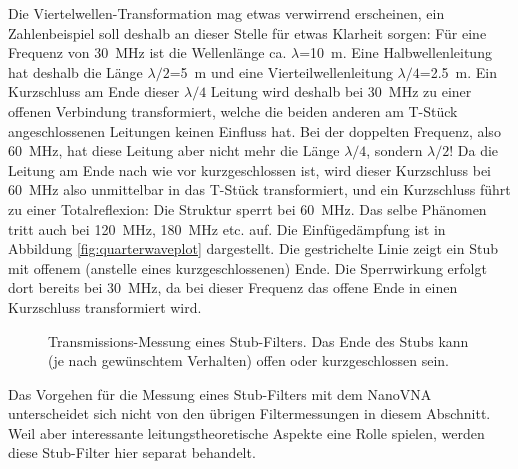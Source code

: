 \documentclass[twoside,a4paper,11pt,halfparskip,DIV=11,notitlepage]{scrartcl}
\begin{document}
Die Viertelwellen-Transformation mag etwas verwirrend erscheinen, ein Zahlenbeispiel
soll deshalb an dieser Stelle für etwas Klarheit sorgen: Für eine Frequenz von
30~MHz ist die Wellenlänge ca. $\lambda$=10~m. Eine Halbwellenleitung hat deshalb
die Länge $\lambda/2$=5~m und eine Vierteilwellenleitung $\lambda/4$=2.5~m. Ein
Kurzschluss am Ende dieser $\lambda/4$ Leitung wird deshalb bei 30~MHz zu einer
offenen Verbindung transformiert, welche die beiden anderen am T-Stück
angeschlossenen Leitungen keinen Einfluss hat. Bei der doppelten Frequenz, also
60~MHz, hat diese Leitung aber nicht mehr die Länge  $\lambda/4$, sondern
$\lambda/2$! Da die Leitung am Ende nach wie vor kurzgeschlossen ist, wird dieser
Kurzschluss bei 60~MHz also unmittelbar in das T-Stück transformiert, und ein
Kurzschluss führt zu einer Totalreflexion: Die Struktur sperrt bei 60~MHz. Das
selbe Phänomen tritt auch bei 120~MHz, 180~MHz etc. auf. Die Einfügedämpfung
ist in Abbildung \ref{fig:quarterwaveplot} dargestellt. Die gestrichelte Linie
zeigt ein Stub mit offenem (anstelle eines kurzgeschlossenen) Ende. Die Sperrwirkung
erfolgt dort bereits bei 30~MHz, da bei dieser Frequenz das offene Ende in einen
Kurzschluss transformiert wird.

\begin{figure}[t]
    \caption{Transmissions-Messung eines Stub-Filters. Das Ende des Stubs kann
    (je nach gewünschtem Verhalten) offen oder kurzgeschlossen sein.}
    \label{fig:quarterwavestub}
\end{figure}

Das Vorgehen für die Messung eines Stub-Filters mit dem NanoVNA unterscheidet
sich nicht von den übrigen Filtermessungen in diesem Abschnitt. Weil aber
interessante leitungstheoretische Aspekte eine Rolle spielen, werden diese
Stub-Filter hier separat behandelt.
\end{document}
